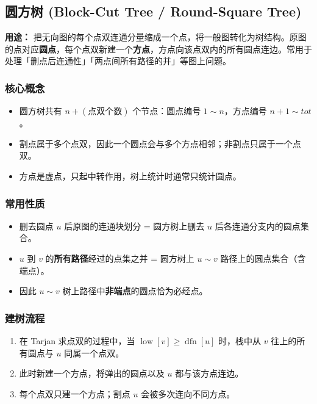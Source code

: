 \subsection{圆方树 (Block-Cut Tree / Round-Square Tree)}

\textbf{用途：} 把无向图的每个点双连通分量缩成一个点，将一般图转化为树结构。原图的点对应\textbf{圆点}，每个点双新建一个\textbf{方点}，方点向该点双内的所有圆点连边。常用于处理「删点后连通性」「两点间所有路径的并」等图上问题。

\subsubsection{核心概念}

\begin{itemize}
  \item 圆方树共有 $n + (\text{点双个数})$ 个节点：圆点编号 $1 \sim n$，方点编号 $n + 1 \sim \mathit{tot}$。
  \item 割点属于多个点双，因此一个圆点会与多个方点相邻；非割点只属于一个点双。
  \item 方点是虚点，只起中转作用，树上统计时通常只统计圆点。
\end{itemize}

\subsubsection{常用性质}

\begin{itemize}
  \item 删去圆点 $u$ 后原图的连通块划分 = 圆方树上删去 $u$ 后各连通分支内的圆点集合。
  \item $u$ 到 $v$ 的\textbf{所有路径}经过的点集之并 = 圆方树上 $u \sim v$ 路径上的圆点集合（含端点）。
  \item 因此 $u \sim v$ 树上路径中\textbf{非端点}的圆点恰为必经点。
\end{itemize}

\subsubsection{建树流程}

\begin{enumerate}
  \item 在 Tarjan 求点双的过程中，当 $\operatorname{low}[v] \ge \operatorname{dfn}[u]$ 时，栈中从 $v$ 往上的所有圆点与 $u$ 同属一个点双。
  \item 此时新建一个方点，将弹出的圆点以及 $u$ 都与该方点连边。
  \item 每个点双只建一个方点；割点 $u$ 会被多次连向不同方点。
\end{enumerate}


